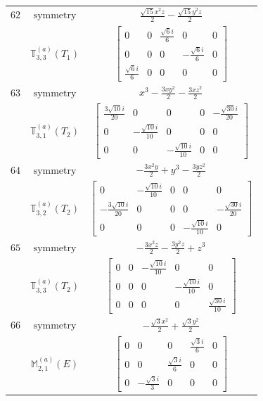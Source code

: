 \documentclass[fleqn,8pt,landscape]{jsarticle}
\begin{document}
\begin{longtable}{ccc}
$ 62 $ & $ \text{symmetry} $ & $ \frac{\sqrt{15} x^{2} z}{2} - \frac{\sqrt{15} y^{2} z}{2} $ \\
$  $ & $ \mathbb{T}_{3,3}^{(a)}(T_{1}) $ & $ \begin{bmatrix} 0 & 0 & \frac{\sqrt{6} i}{6} & 0 & 0 \\ 0 & 0 & 0 & - \frac{\sqrt{6} i}{6} & 0 \\ \frac{\sqrt{6} i}{6} & 0 & 0 & 0 & 0 \end{bmatrix} $ \\ \hline
$ 63 $ & $ \text{symmetry} $ & $ x^{3} - \frac{3 x y^{2}}{2} - \frac{3 x z^{2}}{2} $ \\
$  $ & $ \mathbb{T}_{3,1}^{(a)}(T_{2}) $ & $ \begin{bmatrix} \frac{3 \sqrt{10} i}{20} & 0 & 0 & 0 & - \frac{\sqrt{30} i}{20} \\ 0 & - \frac{\sqrt{10} i}{10} & 0 & 0 & 0 \\ 0 & 0 & - \frac{\sqrt{10} i}{10} & 0 & 0 \end{bmatrix} $ \\ \hline
$ 64 $ & $ \text{symmetry} $ & $ - \frac{3 x^{2} y}{2} + y^{3} - \frac{3 y z^{2}}{2} $ \\
$  $ & $ \mathbb{T}_{3,2}^{(a)}(T_{2}) $ & $ \begin{bmatrix} 0 & - \frac{\sqrt{10} i}{10} & 0 & 0 & 0 \\ - \frac{3 \sqrt{10} i}{20} & 0 & 0 & 0 & - \frac{\sqrt{30} i}{20} \\ 0 & 0 & 0 & - \frac{\sqrt{10} i}{10} & 0 \end{bmatrix} $ \\ \hline
$ 65 $ & $ \text{symmetry} $ & $ - \frac{3 x^{2} z}{2} - \frac{3 y^{2} z}{2} + z^{3} $ \\
$  $ & $ \mathbb{T}_{3,3}^{(a)}(T_{2}) $ & $ \begin{bmatrix} 0 & 0 & - \frac{\sqrt{10} i}{10} & 0 & 0 \\ 0 & 0 & 0 & - \frac{\sqrt{10} i}{10} & 0 \\ 0 & 0 & 0 & 0 & \frac{\sqrt{30} i}{10} \end{bmatrix} $ \\ \hline
$ 66 $ & $ \text{symmetry} $ & $ - \frac{\sqrt{3} x^{2}}{2} + \frac{\sqrt{3} y^{2}}{2} $ \\
$  $ & $ \mathbb{M}_{2,1}^{(a)}(E) $ & $ \begin{bmatrix} 0 & 0 & 0 & \frac{\sqrt{3} i}{6} & 0 \\ 0 & 0 & \frac{\sqrt{3} i}{6} & 0 & 0 \\ 0 & - \frac{\sqrt{3} i}{3} & 0 & 0 & 0 \end{bmatrix} $ \\ \hline

\end{longtable}
\end{document}
